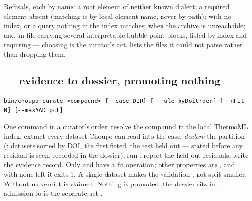 \documentclass[11pt,a4paper]{article}
\begin{document}
Refusals, each by name: a root element of neither known dialect; a
required element absent (matching is by local element name, never by
path);  with no index, or a query nothing in the index
matches;  when the archive is unreachable; and an
 file carrying several interpretable bubble-point
blocks, listed by index and requiring  --- choosing is
the curator's act.   lists the files it could not parse
rather than dropping them.

\subsection{ --- evidence to dossier, promoting nothing}\label{sec:tool-curate}

\begin{lstlisting}
bin/choupo-curate <compound> [--case DIR] [--rule byDoiOrder] [--nFit N] [--maxAAD pct]
\end{lstlisting}

One command in a curator's order: resolve the compound in the local
ThermoML index, extract every dataset Choupo can read into the case,
\emph{declare} the partition (: datasets sorted by DOI,
the first  fitted, the rest held out --- stated before any
residual is seen, recorded in the dossier), run ,
report the held-out residuals, write the evidence record.  Only
 and  have a fit operation;
other properties are , and with none left it exits 1.  A
single dataset makes the validation , not split smaller.
Without  no verdict is claimed.  Nothing is promoted: the
dossier sits in ; admission to
 is the separate act
.
\end{document}
